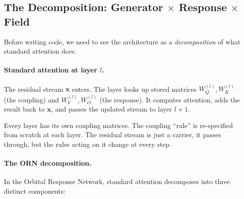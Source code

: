\documentclass[11pt, a4paper]{article}
\newcommand{\x}{\mathbf{x}}
\theoremstyle{remark}
\begin{document}
\subsection{The Decomposition: Generator $\times$ Response $\times$ Field}
\label{sec:grf:decomposition}

Before writing code, we need to see the architecture as a \emph{decomposition} of what standard attention does.

\paragraph{Standard attention at layer $l$.}
The residual stream $\x$ enters.
The layer looks up stored matrices $W_Q^{(l)}, W_K^{(l)}$ (the coupling) and $W_V^{(l)}, W_O^{(l)}$ (the response).
It computes attention, adds the result back to $\x$, and passes the updated stream to layer $l{+}1$.

Every layer has its own coupling matrices.
The coupling ``rule'' is re-specified from scratch at each layer.
The residual stream is just a carrier, it passes through, but the rules acting on it change at every step.

\paragraph{The ORN decomposition.}
In the Orbital Response Network, standard attention decomposes into three distinct components:
\end{document}
